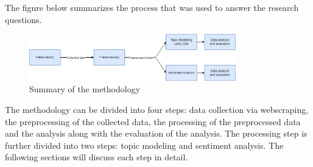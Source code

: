 The figure below summarizes the process that was used to answer the research questions.

\begin{figure}[h]
    \centering
    \includegraphics[width=0.8\textwidth]{resources/methodology.png}
    \caption{Summary of the methodology}
    \label{fig:methodology}
\end{figure}

The methodology can be divided into four steps: data collection via webscraping, the preprocessing of the collected data, the processing of the preprocessed data and the analysis along with the evaluation of the analysis. The processing step is further divided into two steps: topic modeling and sentiment analysis. The following sections will discuss each step in detail.